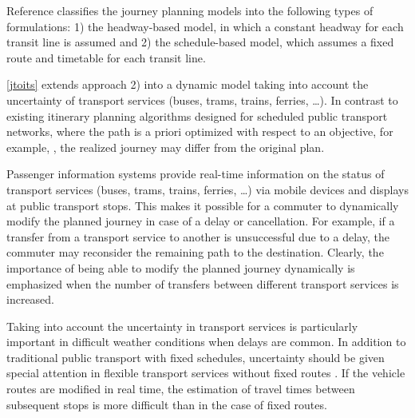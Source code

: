 \documentclass[dissertation,draft*]{aaltoseries}
\begin{document}
Reference \cite{zografos} classifies the journey planning models into
the following types of formulations: 1) the headway-based model, in which
a constant headway for each transit line is assumed \cite{wong1998}
and 2) the schedule-based model, which assumes a
fixed route and timetable for each transit line.

\ref{jtoits} extends approach 2) into a dynamic model taking into account the 
uncertainty of transport services (buses, trams, trains, ferries, \ldots). 
In contrast to existing itinerary planning algorithms designed for scheduled public transport networks, 
where the path is a priori optimized with respect to an objective, for example,
\cite{androutsopoulos}, the realized journey may differ from the original plan. 

Passenger information systems provide real-time information on the status of transport services 
(buses, trams, trains, ferries, \ldots) via 
mobile devices %
and displays at public transport stops. 
This makes it possible for a commuter to
dynamically modify the planned journey in case of a delay or cancellation.
For example, if a transfer from a transport service
to another is unsuccessful due to a delay, the commuter may reconsider the 
remaining path to the destination. 
Clearly, the importance of being able to modify the planned journey dynamically
is emphasized when the number of transfers between different transport services is increased.

Taking into account the uncertainty in transport services is particularly important in difficult weather conditions
when delays are common. In addition to traditional public transport with fixed schedules, uncertainty 
should be given special attention in flexible transport 
services without fixed routes \cite{mulley}. If the vehicle routes are modified 
in real time, the estimation of travel times between subsequent stops is more difficult than in the case
of fixed routes.
\end{document}
